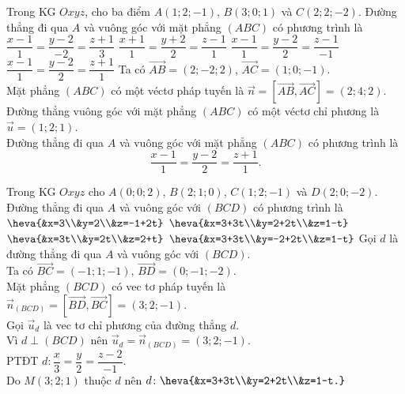 \begin{ex}%
	Trong KG $Oxyz$, cho ba điểm $A(1;2;-1)$, $B(3;0;1)$ và $C(2;2;-2)$. Đường thẳng đi qua $A$ và vuông góc với mặt phẳng $(ABC)$ có phương trình là
	\choice
	{$\dfrac{x-1}{1}=\dfrac{y-2}{-2}=\dfrac{z+1}{3}$}
	{$\dfrac{x+1}{1}=\dfrac{y+2}{2}=\dfrac{z-1}{1}$}
	{$\dfrac{x-1}{1}=\dfrac{y-2}{2}=\dfrac{z-1}{-1}$}
	{\True $\dfrac{x-1}{1}=\dfrac{y-2}{2}=\dfrac{z+1}{1}$}
	\loigiai
	{Ta có $\overrightarrow{AB}=(2;-2;2)$, $\overrightarrow{AC}=(1;0;-1)$.\\
		Mặt phẳng $(ABC)$ có một véctơ pháp tuyến là $\vec{n}=\left[\overrightarrow{AB},\overrightarrow{AC}\right]=(2;4;2)$.\\
		Đường thẳng vuông góc với mặt phẳng $(ABC)$ có một véctơ chỉ phương là $\vec{u}=(1;2;1)$.\\
		Đường thẳng đi qua $A$ và vuông góc với mặt phẳng $(ABC)$ có phương trình là
		\[\dfrac{x-1}{1}=\dfrac{y-2}{2}=\dfrac{z+1}{1}.\]
	}
\end{ex}
\begin{ex}%
	Trong KG $Oxyz$ cho $A(0;0;2)$, $B(2;1;0)$, $C(1;2;-1)$ và $D(2;0;-2)$. Đường thẳng đi qua $A$ và vuông góc với $(BCD)$ có phương trình là
	\choice
	{$\heva{&x=3\\&y=2\\&z=-1+2t}$}
	{\True $\heva{&x=3+3t\\&y=2+2t\\&z=1-t}$}
	{$\heva{&x=3t\\&y=2t\\&z=2+t}$}
	{$\heva{&x=3+3t\\&y=-2+2t\\&z=1-t}$}
	\loigiai
	{
		Gọi $d$ là đường thẳng đi qua $A$ và vuông góc với $(BCD)$.\\
		Ta có $\overrightarrow{BC}=(-1;1;-1)$, $\overrightarrow{BD}=(0;-1;-2)$.\\
		Mặt phẳng $(BCD)$ có vec tơ pháp tuyến là $\vec{n}_{(BCD)}=\left[\overrightarrow{BD},\overrightarrow{BC}\right]=(3;2;-1)$.\\
		Gọi $\vec{u}_{d}$ là vec tơ chỉ phương của đường thẳng $d$.\\
		Vì $d\perp(BCD)$ nên $\overrightarrow{u}_{d}=\vec{n}_{(BCD)}=(3;2;-1)$.\\
		PTĐT $d\colon\dfrac{x}{3}=\dfrac{y}{2}=\dfrac{z-2}{-1}$.\\
		Do $M(3;2;1)$ thuộc $d$ nên $d\colon\heva{&x=3+3t\\&y=2+2t\\&z=1-t.}$
	}
\end{ex}
